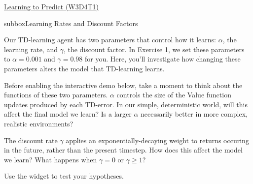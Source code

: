 \begin{textbox}{\href{https://compneuro.neuromatch.io/tutorials/W3D4_ReinforcementLearning/student/W3D4_Tutorial1.html}{Learning to Predict (W3D4T1)} }
\begin{subbox}{subbox}{Learning Rates and Discount Factors}
\scriptsize


Our TD-learning agent has two parameters that control how it learns: $\alpha$, the learning rate, and $\gamma$, the discount factor. In Exercise 1, we set these parameters to $\alpha=0.001$ and $\gamma=0.98$ for you. Here, you'll investigate how changing these parameters alters the model that TD-learning learns.

Before enabling the interactive demo below, take a moment to think about the functions of these two parameters. $\alpha$ controls the size of the Value function updates produced by each TD-error. In our simple, deterministic world, will this affect the final model we learn? Is a larger $\alpha$ necessarily better in more complex, realistic environments?

The discount rate $\gamma$ applies an exponentially-decaying weight to returns occuring in the future, rather than the present timestep. How does this affect the model we learn? What happens when $\gamma=0$ or $\gamma \geq 1$?

Use the widget to test your hypotheses.

\begin{center}
    

\end{center}
\end{subbox}
\end{textbox}

